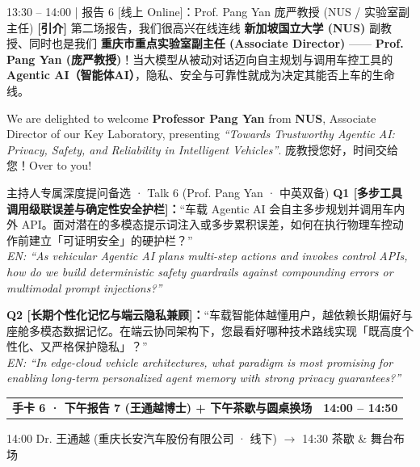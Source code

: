 \documentclass[12pt,a4paper]{article}
\makeatletter
\newcommand{\cardbanner}[3]{%
  \begin{tcolorbox}[
    enhanced, colback=nusnavy, colframe=nusnavy, arc=1.8mm,
    boxrule=0pt, left=3.8mm, right=3.8mm, top=2.1mm, bottom=2.2mm,
    before skip=0pt, after skip=2.4mm,
    borderline south={1.1mm}{0mm}{nusorange}
  ]
    \begin{tabularx}{\linewidth}{@{}X r@{}}
      {\fontsize{13.2}{16}\selectfont\color{white}\textbf{#1}} &
      {\fontsize{11.2}{14}\selectfont\color{orangebg}\textbf{#2}}
    \end{tabularx}
    \vspace{0.6mm}
    {\fontsize{9.3}{11.8}\selectfont\color{slate200}#3}
  \end{tcolorbox}
}
\makeatother
\begin{document}
\begin{scriptbox}{13:30 – 14:00 \;|\; 报告 6 [线上 Online]：Prof. Pang Yan 庞严教授 (NUS / 实验室副主任)}
\fontsize{11.2}{16}\selectfont
\textbf{[引介]} 第二场报告，我们很高兴在线连线 \textbf{新加坡国立大学 (NUS)} 副教授、同时也是我们 \textbf{重庆市重点实验室副主任 (Associate Director)} —— \textbf{Prof. Pang Yan (庞严教授)}！当大模型从被动对话迈向自主规划与调用车控工具的 \textbf{Agentic AI（智能体AI）}，隐私、安全与可靠性就成为决定其能否上车的生命线。\par
We are delighted to welcome \textbf{Professor Pang Yan} from \textbf{NUS}, Associate Director of our Key Laboratory, presenting \textit{``Towards Trustworthy Agentic AI: Privacy, Safety, and Reliability in Intelligent Vehicles''}. 庞教授您好，时间交给您！Over to you!
\end{scriptbox}
\begin{qabox}{主持人专属深度提问备选 · Talk 6 (Prof. Pang Yan · 中英双备)}
\fontsize{10.1}{14.3}\selectfont
\textbf{Q1 [多步工具调用级联误差与确定性安全护栏]：}“车载 Agentic AI 会自主多步规划并调用车内外 API。面对潜在的多模态提示词注入或多步累积误差，如何在执行物理车控动作前建立「可证明安全」的硬护栏？” \\
\textit{EN: ``As vehicular Agentic AI plans multi-step actions and invokes control APIs, how do we build deterministic safety guardrails against compounding errors or multimodal prompt injections?''}\par
\textbf{Q2 [长期个性化记忆与端云隐私兼顾]：}“车载智能体越懂用户，越依赖长期偏好与座舱多模态数据记忆。在端云协同架构下，您最看好哪种技术路线实现「既高度个性化、又严格保护隐私」？” \\
\textit{EN: ``In edge-cloud vehicle architectures, what paradigm is most promising for enabling long-term personalized agent memory with strong privacy guarantees?''}
\end{qabox}

\newpage

\cardbanner{手卡 6 · 下午报告 7 (王通越博士) + 下午茶歇与圆桌换场}{14:00 – 14:50}{14:00 Dr. 王通越 (重庆长安汽车股份有限公司 · 线下) $\rightarrow$ 14:30 茶歇 \& 舞台布场}
\end{document}

